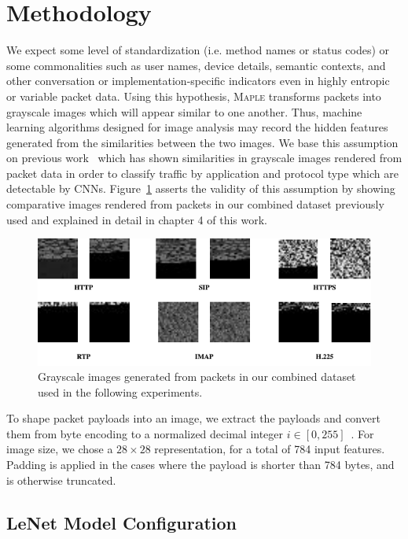 \section{Methodology}

We expect some level of standardization (i.e. method names or status codes) or some commonalities such as user names, device details, semantic contexts, and other conversation or implementation-specific indicators even in highly entropic or variable packet data. Using this hypothesis, \textsc{Maple} transforms packets into grayscale images which will appear similar to one another. Thus, machine learning algorithms designed for image analysis may record the hidden features generated from the similarities between the two images. We base this assumption on previous work~\cite{lim2019network} which has shown similarities in grayscale images rendered from packet data in order to classify traffic by application and protocol type which are detectable by CNNs. Figure~\ref{fig:grayscale} asserts the validity of this assumption by showing comparative images rendered from packets in our combined dataset previously used and explained in detail in chapter 4 of this work.

\begin{figure} [ht!]
\includegraphics[width=\linewidth]{chapters/5/img/grayscaleimages.drawio.png}
\caption{Grayscale images generated from packets in our combined dataset used in the following experiments.}
\label{fig:grayscale}
\end{figure}

To shape packet payloads into an image, we extract the payloads and convert them from byte encoding to a normalized decimal integer $i \in [0,255]$~\cite{jo2020packet}. For image size, we chose a $28\times28$ representation, for a total of 784 input features. Padding is applied in the cases where the payload is shorter than 784 bytes, and is otherwise truncated.

\subsection{LeNet Model Configuration}

